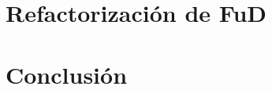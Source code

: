 \documentclass[a4paper,12pt]{report}
\begin{document}
    
    
    
    
    

    \part{Refactorización de FuD}
    \label{part:refactorin_fud}

    
    
    

    \part{Conclusión}
    \label{part:conclusion}

    
    

    
    

    \appendix \label{appendix}
    \addappheadtotoc
    \appendixpage
    \newpage

    
    
    
\end{document}
